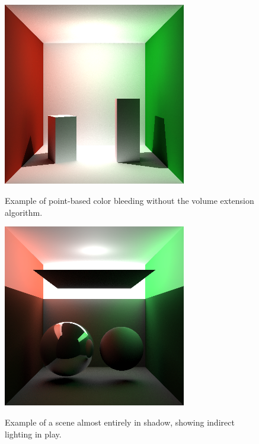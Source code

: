 \documentclass[12pt]{ucthesis}
\newcommand{\captionfonts}{\small\bf\ssp}
\begin{document}

\clearpage







\begin{figure}[h!]
    \centering
    \includegraphics[width=80mm]{img/indirect_box_high.png}
    \captionfonts
    \caption{Example of point-based color bleeding without the volume extension algorithm.}
\end{figure}

\begin{figure}[h!]
    \centering
    \includegraphics[width=80mm]{img/two_sphere_indir.png}
    \captionfonts
    \caption{Example of a scene almost entirely in shadow, showing indirect lighting in play.}
\end{figure}
\end{document}
